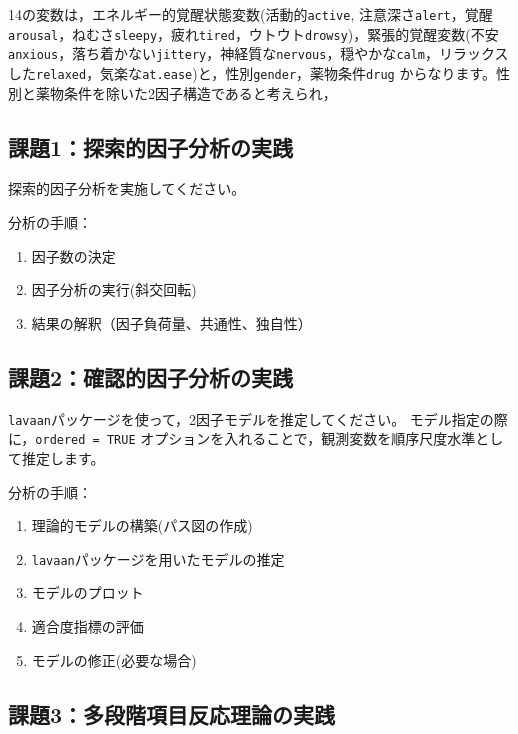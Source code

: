 \documentclass[
  a4paper,
]{ltjsbook}
\providecommand{\tightlist}{%
  \setlength{\itemsep}{0pt}\setlength{\parskip}{0pt}}
\begin{document}
14の変数は，エネルギー的覚醒状態変数(活動的\texttt{active},
注意深さ\texttt{alert}，覚醒\texttt{arousal}，ねむさ\texttt{sleepy}，疲れ\texttt{tired}，ウトウト\texttt{drowsy})，緊張的覚醒変数(不安\texttt{anxious}，落ち着かない\texttt{jittery}，神経質な\texttt{nervous}，穏やかな\texttt{calm}，リラックスした\texttt{relaxed}，気楽な\texttt{at.ease})と，性別\texttt{gender}，薬物条件\texttt{drug}
からなります。性別と薬物条件を除いた2因子構造であると考えられ，

\subsection{課題1：探索的因子分析の実践}\label{ux8ab2ux984c1ux63a2ux7d22ux7684ux56e0ux5b50ux5206ux6790ux306eux5b9fux8df5}

探索的因子分析を実施してください。

分析の手順：

\begin{enumerate}
\def\labelenumi{\arabic{enumi}.}
\tightlist
\item
  因子数の決定
\item
  因子分析の実行(斜交回転)
\item
  結果の解釈（因子負荷量、共通性、独自性）
\end{enumerate}

\subsection{課題2：確認的因子分析の実践}\label{ux8ab2ux984c2ux78baux8a8dux7684ux56e0ux5b50ux5206ux6790ux306eux5b9fux8df5}

\texttt{lavaan}パッケージを使って，2因子モデルを推定してください。
モデル指定の際に，\texttt{ordered\ =\ TRUE}
オプションを入れることで，観測変数を順序尺度水準として推定します。

分析の手順：

\begin{enumerate}
\def\labelenumi{\arabic{enumi}.}
\tightlist
\item
  理論的モデルの構築(パス図の作成)
\item
  \texttt{lavaan}パッケージを用いたモデルの推定
\item
  モデルのプロット
\item
  適合度指標の評価
\item
  モデルの修正(必要な場合)
\end{enumerate}

\subsection{課題3：多段階項目反応理論の実践}\label{ux8ab2ux984c3ux591aux6bb5ux968eux9805ux76eeux53cdux5fdcux7406ux8ad6ux306eux5b9fux8df5}
\end{document}
